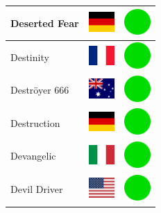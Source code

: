 \documentclass[12pt, a4paper, twoside]{report}
\begin{document}
\begin{center}
\begin{longtable}{|p{5cm}|p{2cm}|p{2cm}|}
 Deserted Fear                                              & \includegraphics[width=1cm]{4x3/de} &   \includegraphics[width=1cm]{likes/y} \\ \hline
 Destinity                                                  & \includegraphics[width=1cm]{4x3/fr} &   \includegraphics[width=1cm]{likes/y} \\ \hline
 Deströyer 666                                              & \includegraphics[width=1cm]{4x3/au} &   \includegraphics[width=1cm]{likes/y} \\ \hline
 Destruction                                                & \includegraphics[width=1cm]{4x3/de} &   \includegraphics[width=1cm]{likes/y} \\ \hline
 Devangelic                                                 & \includegraphics[width=1cm]{4x3/it} &   \includegraphics[width=1cm]{likes/y} \\ \hline
 Devil Driver                                               & \includegraphics[width=1cm]{4x3/us} &   \includegraphics[width=1cm]{likes/y} \\ \hline

\end{longtable}
\end{center}
\end{document}

